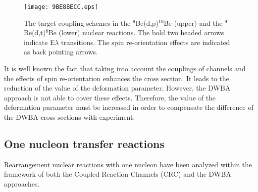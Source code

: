 \documentclass[10pt]{iopart}
\begin{document}
 
\begin{figure}[bp]
\centering
\texttt{[image: 9BE8BECC.eps]}
\caption{ \label{9BE8BECC} The target coupling schemes in the $^9$Be(d,p)$^{10}$Be (upper) and the $^9$Be(d,t)$^8$Be (lower) nuclear reactions. The bold two headed arrows indicate E$\lambda$ transitions. The spin re-orientation effects are indicated as back pointing arrows.}
\end{figure}	

 It is well known the fact that taking into account the couplings of channels and the effects of spin re-orientation enhances the cross section. It leads to the reduction of the value of the deformation parameter. However, the DWBA approach is not able to cover these effects. Therefore, the value of the deformation parameter must be increased  in order to compensate the difference of the DWBA cross sections with experiment. 




 




\subsection{One nucleon transfer reactions } 
Rearrangement nuclear reactions with one nucleon have been analyzed within the framework of both the Coupled Reaction Channels (CRC) and the DWBA approaches. 
 
\end{document}
